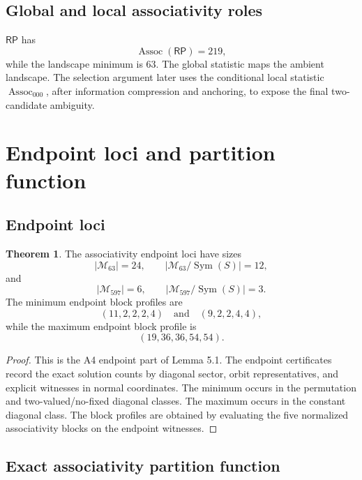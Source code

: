 \documentclass[11pt]{article}
\theoremstyle{definition}
\newtheorem{theorem}{Theorem}[section]
\newcommand{\RP}{\mathsf{RP}}
\begin{document}
\subsection{Global and local associativity
roles}\label{global-and-local-associativity-roles}

\(\RP\) has \[
\operatorname{Assoc}(\RP)=219,
\] while the landscape minimum is \(63\). The global statistic maps the
ambient landscape. The selection argument later uses the conditional
local statistic \(\operatorname{Assoc}_{000}\), after information
compression and anchoring, to expose the final two-candidate ambiguity.

\section{Endpoint loci and partition
function}\label{endpoint-loci-and-partition-function}

\subsection{Endpoint loci}\label{endpoint-loci}

\begin{theorem}
\label{thm:6.1}
The associativity endpoint loci have sizes \[
|\mathcal M_{63}|=24,
\qquad
|\mathcal M_{63}/\operatorname{Sym}(S)|=12,
\] and \[
|\mathcal M_{597}|=6,
\qquad
|\mathcal M_{597}/\operatorname{Sym}(S)|=3.
\] The minimum endpoint block profiles are \[
(11,2,2,2,4)
\quad\text{and}\quad
(9,2,2,4,4),
\] while the maximum endpoint block profile is \[
(19,36,36,54,54).
\]
\end{theorem}

\begin{proof}
This is the A4 endpoint part of Lemma 5.1. The endpoint
certificates record the exact solution counts by diagonal sector, orbit
representatives, and explicit witnesses in normal coordinates. The
minimum occurs in the permutation and two-valued/no-fixed diagonal
classes. The maximum occurs in the constant diagonal class. The block
profiles are obtained by evaluating the five normalized associativity
blocks on the endpoint witnesses.
\end{proof}

\subsection{Exact associativity partition
function}\label{exact-associativity-partition-function}
\end{document}
